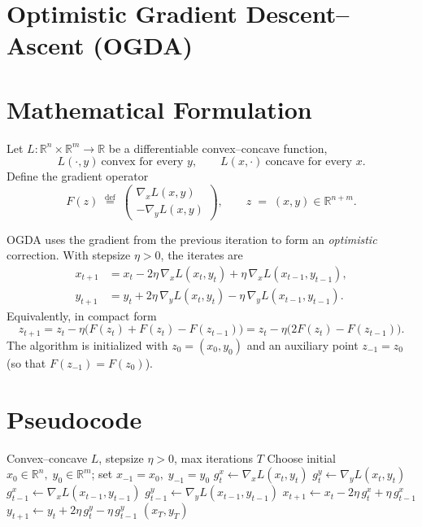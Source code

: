 \documentclass{article}
\newcommand{\R}{\mathbb{R}}
\begin{document}
\section*{Optimistic Gradient Descent–Ascent (OGDA)}

\section*{Mathematical Formulation}
Let $L:\R^{n}\times\R^{m}\rightarrow \R$ be a differentiable convex–concave function,
\[
L(\cdot ,y)\ \text{convex for every }y,\qquad 
L(x,\cdot )\ \text{concave for every }x .
\]
Define the gradient operator
\[
F(z)\;\stackrel{\text{def}}{=}\;
\begin{pmatrix}
\nabla_{x}L(x,y)\\[2mm]
-\nabla_{y}L(x,y)
\end{pmatrix},
\qquad 
z\;=\;(x,y)\in\R^{n+m}.
\]

OGDA uses the gradient from the previous iteration to form an \emph{optimistic} correction.
With stepsize $\eta>0$, the iterates are
\begin{align}
x_{t+1}&=x_{t}-2\eta\,\nabla_{x}L(x_{t},y_{t})+\eta\,\nabla_{x}L(x_{t-1},y_{t-1}),\label{eq:ogda-x}\\
y_{t+1}&=y_{t}+2\eta\,\nabla_{y}L(x_{t},y_{t})-\eta\,\nabla_{y}L(x_{t-1},y_{t-1}).\label{eq:ogda-y}
\end{align}
Equivalently, in compact form
\begin{equation}
z_{t+1}=z_{t}-\eta\bigl(F(z_{t})+F(z_{t})-F(z_{t-1})\bigr)
= z_{t}-\eta\bigl(2F(z_{t})-F(z_{t-1})\bigr).\tag{OGDA}
\end{equation}
The algorithm is initialized with $z_{0}=(x_{0},y_{0})$ and an auxiliary point $z_{-1}=z_{0}$ (so that $F(z_{-1})=F(z_{0})$).

\section*{Pseudocode}
\begin{algorithm}[H]
\caption{Optimistic Gradient Descent–Ascent}
\begin{algorithmic}[1]
\Require Convex–concave $L$, stepsize $\eta>0$, max iterations $T$
\State Choose initial $x_{0}\in\R^{n},\;y_{0}\in\R^{m}$; set $x_{-1}=x_{0},\;y_{-1}=y_{0}$
    \State $g^{x}_{t}\gets \nabla_{x}L(x_{t},y_{t})$
    \State $g^{y}_{t}\gets \nabla_{y}L(x_{t},y_{t})$
    \State $g^{x}_{t-1}\gets \nabla_{x}L(x_{t-1},y_{t-1})$
    \State $g^{y}_{t-1}\gets \nabla_{y}L(x_{t-1},y_{t-1})$
    \State $x_{t+1}\gets x_{t}-2\eta\,g^{x}_{t}+\eta\,g^{x}_{t-1}$   
    \State $y_{t+1}\gets y_{t}+2\eta\,g^{y}_{t}-\eta\,g^{y}_{t-1}$   
\EndFor
\State \Return $(x_{T},y_{T})$
\end{algorithmic}
\end{algorithm}
\end{document}
